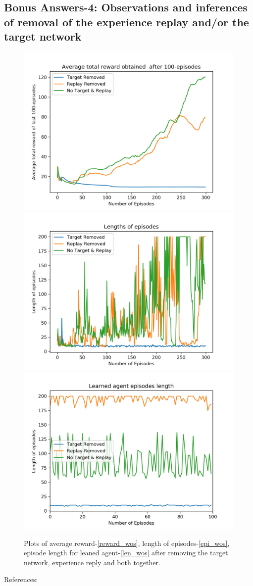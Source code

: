 \documentclass[preprint,12pt]{elsarticle}
\begin{document}
  
  
\subsection{Bonus Answers-4: Observations and inferences of removal of the experience replay and/or the target network}


  
    \begin{figure}[H]
    	\centering  
    	\subfigure
    	{\includegraphics[width=0.4\linewidth]{./Avg_rewards_wos.png}\label{reward_wos}}
    	\subfigure
    	{\includegraphics[width=0.4\linewidth]{./Episode_lengths_wos.png}\label{len_wos}}
    	\subfigure
    	{\includegraphics[width=0.4\linewidth]{./Learned_Episode_lengths_wos.png}\label{epi_wos}}
    	\caption{Plots of average reward-\ref{reward_wos}, length of episodes-\ref{epi_wos}, episode length for leaned agent-\ref{len_wos} after removing the target network, experience reply and both together. }
    	\label{fig:without}
    \end{figure}
	\newpage
	
	References:
	\\
	
	
\end{document}
